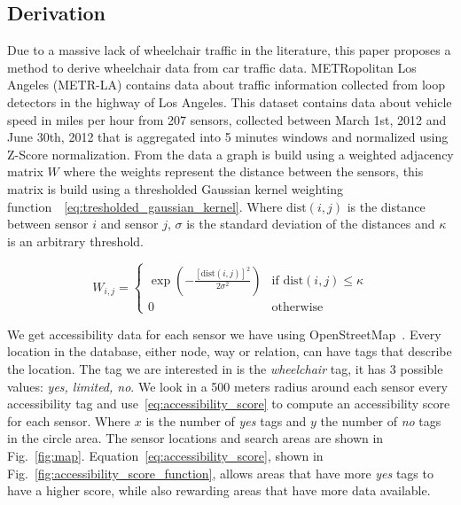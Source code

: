 \subsection{Derivation}\label{subsec:derivation}
Due to a massive lack of wheelchair traffic in the literature, this paper proposes a method to derive wheelchair data from car traffic data.
METRopolitan Los Angeles (METR-LA) contains data about traffic information collected from loop detectors in the highway of Los Angeles.
This dataset contains data about vehicle speed in miles per hour from 207 sensors, collected between March 1st, 2012 and June 30th, 2012 that is aggregated into 5 minutes windows and normalized using Z-Score normalization.
From the data a graph is build using a weighted adjacency matrix $W$ where the weights represent the distance between the sensors, this matrix is build using a thresholded Gaussian kernel weighting function~\cite{Shuman_2013}~\eqref{eq:tresholded_gaussian_kernel}.
Where $\text{dist}(i,j)$ is the distance between sensor $i$ and sensor $j$, $\sigma$ is the standard deviation of the distances and $\kappa$ is an arbitrary threshold.
\vspace{1em}

\begin{equation}
    W_{i,j} =
    \begin{cases}
        \exp\left( -\frac{\left[\text{dist}(i,j)\right]^2}{2\sigma^2} \right) & \text{if } \text{dist}(i,j) \leq \kappa \\
        0 & \text{otherwise}
    \end{cases}\label{eq:tresholded_gaussian_kernel}
\end{equation}
\vspace{1em}

We get accessibility data for each sensor we have using OpenStreetMap~\cite{OpenStreetMap}.
Every location in the database, either node, way or relation, can have tags that describe the location.
The tag we are interested in is the \textit{wheelchair} tag, it has 3 possible values: \textit{yes, limited, no}.
We look in a 500 meters radius around each sensor every accessibility tag and use~\eqref{eq:accessibility_score} to compute an accessibility score for each sensor.
Where $x$ is the number of \textit{yes} tags and $y$ the number of \textit{no} tags in the circle area.
The sensor locations and search areas are shown in Fig.~\ref{fig:map}.
Equation~\eqref{eq:accessibility_score}, shown in Fig.~\ref{fig:accessibility_score_function},  allows areas that have more \textit{yes} tags to have a higher score, while also rewarding areas that have more data available.

